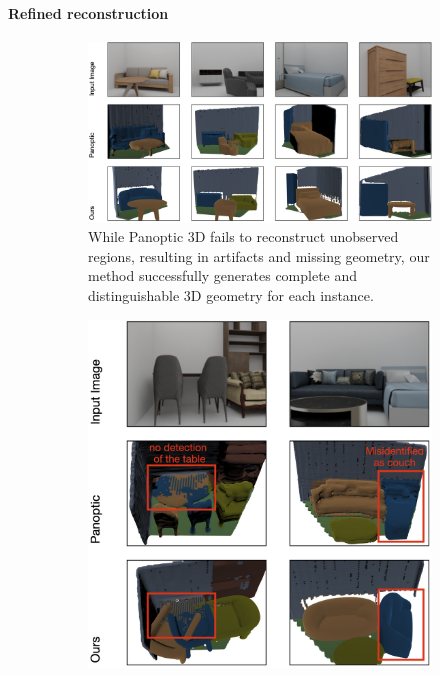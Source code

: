 \vspace*{-3mm}
\paragraph{Refined reconstruction}
\label{sec:refinedrec}

\begin{figure}%
  \begin{subfigure}[t]{109mm}
    \includegraphics[width=\linewidth]{images/image1.png}
    \caption{While Panoptic 3D fails to reconstruct unobserved regions, resulting in artifacts and missing geometry, our method successfully generates complete and distinguishable 3D geometry for each instance.}\label{fig:comparison_good}
  \end{subfigure}
  \qquad
  \begin{subfigure}[t]{56mm}
    \includegraphics[width=\linewidth]{images/image2.png}

\end{subfigure}
\end{figure}
